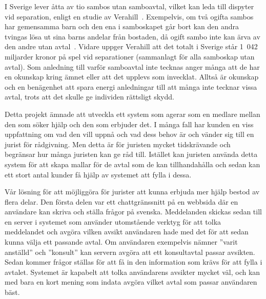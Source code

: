 \documentclass[a4paper,12pt]{article}
\begin{document}

I Sverige lever åtta av tio sambos utan samboavtal, vilket kan leda till dispyter vid separation, enligt en studie av Verahill~\cite{web:verahill}. Exempelvis, om två ogifta sambos har gemensamma barn och den ena i samboskapet går bort kan den andra tvingas lösa ut sina barns andelar från bostaden, då ogift sambo inte kan ärva av den andre utan avtal~\cite{web:inter-sambo}. Vidare uppger Verahill att det totalt i Sverige står 1~042 miljarder kronor på spel vid separationer (sammanlagt för alla samboskap utan avtal). Som anledning till varför samboavtal inte tecknas anger många att de har en okunskap kring ämnet eller att det upplevs som invecklat. Alltså är okunskap och en benägenhet att spara energi anledningar till att många inte tecknar vissa avtal, trots att det skulle ge individen rättsligt skydd. 

Detta projekt ämnade att utveckla ett system som agerar som en medlare mellan den som söker hjälp och den som erbjuder det. I många fall har kunden en viss uppfattning om vad den vill uppnå och vad dess behov är och vänder sig till en jurist för rådgivning. Men detta är för juristen mycket tidskrävande och begränsar hur många juristen kan ge råd till. Istället kan juristen använda detta system för att skapa mallar för de avtal som de kan tillhandahålla och sedan kan ett stort antal kunder få hjälp av systemet att fylla i dessa.

Vår lösning för att möjliggöra för jurister att kunna erbjuda mer hjälp bestod av flera delar. Den första delen var ett chattgränssnitt på en webbsida där en användare kan skriva och ställa frågor på svenska. Meddelanden skickas sedan till en server i systemet som använder utomstående verktyg för att tolka meddelandet och avgöra vilken avsikt användaren hade med det för att sedan kunna välja ett passande avtal. Om användaren exempelvis nämner ''varit anställd'' och ''konsult'' kan servern avgöra att ett konsultavtal passar avsikten. Sedan kommer frågor ställas för att få in den information som krävs för att fylla i avtalet. Systemet är kapabelt att tolka användarens avsikter mycket väl, och kan med bara en kort mening som indata avgöra vilket avtal som passar användaren bäst. 
\end{document}
